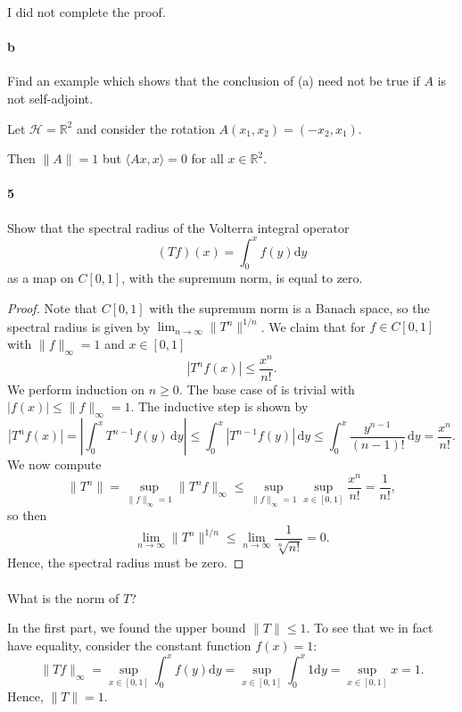 \documentclass[12pt]{article}
\newlength{\myparskip}
\newenvironment{fullbox}{\begin{lrbox}{\savefullbox}\begin{minipage}{\dimexpr\textwidth-2\fboxsep\relax}\setlength{\parskip}{\myparskip}}{\end{minipage}\end{lrbox}\framebox[\textwidth]{\usebox{\savefullbox}}}
\newenvironment{pbox}[1][]{\begin{fullbox}\def\temp{#1}\ifx\temp\empty\else\paragraph{#1}\phantom{}\fi}{\end{fullbox}}
\theoremstyle{definition}
\newcommand{\R}{\mathbb{R}}
\newcommand{\<}{\langle}
\renewcommand{\>}{\rangle}
\newcommand{\dd}{\mathrm{d}}
\newcommand{\HH}{\mathcal{H}}
\begin{document}
I did not complete the proof.

\begin{pbox}[b]
    Find an example which shows that the conclusion of (a) need not be true if $A$ is not self-adjoint.
\end{pbox}

Let $\HH = \R^2$ and consider the rotation $A(x_1, x_2) = (-x_2, x_1)$.

Then $\|A\| = 1$ but $\<Ax, x\> = 0$ for all $x \in \R^2$.

\newpage

\begin{pbox}[5]
    Show that the spectral radius of the Volterra integral operator
    \[
        (Tf)(x) = \int_{0}^{x} f(y) \dd{y} 
    \]
    as a map on $C[0, 1]$, with the supremum norm, is equal to zero.
\end{pbox}

\begin{proof}
    Note that $C[0, 1]$ with the supremum norm is a Banach space, so the spectral radius is given by $\lim_{n \to \infty} \|T^n\|^{1/n}$.
    We claim that for $f \in C[0, 1]$ with $\|f\|_\infty = 1$ and $x \in [0, 1]$
    \[
        |T^nf(x)| \leq \frac{x^n}{n!}.
    \]
    We perform induction on $n \geq 0$.
    The base case of is trivial with $|f(x)| \leq \|f\|_\infty = 1$.
    The inductive step is shown by
    \[
        |T^nf(x)|
            = \left|\int_{0}^{x} T^{n-1}f(y) \,\dd{y} \right|
            \leq \int_{0}^{x} |T^{n-1}f(y)| \,\dd{y}
            \leq \int_{0}^{x} \frac{y^{n-1}}{(n-1)!} \,\dd{y}
            = \frac{x^n}{n!}.
    \]
    We now compute
    \[
        \|T^n\|
            = \sup_{\|f\|_\infty = 1} \|T^nf\|_\infty
            \leq \sup_{\|f\|_\infty = 1} \sup_{x \in [0, 1]} \frac{x^n}{n!}
            = \frac{1}{n!},
    \]
    so then
    \[
        \lim_{n\to\infty} \|T^n\|^{1/n}
            \leq \lim_{n\to\infty} \frac{1}{\sqrt[n]{n!}}
            = 0.
    \]
    Hence, the spectral radius must be zero.
\end{proof}

\begin{pbox}
    What is the norm of $T$?
\end{pbox}

In the first part, we found the upper bound $\|T\| \leq 1$.
To see that we in fact have equality, consider the constant function $f(x) = 1$:
\[
    \|Tf\|_\infty
        = \sup_{x \in [0, 1]} \int_{0}^{x} f(y) \dd{y} 
        = \sup_{x \in [0, 1]} \int_{0}^{x} 1 \dd{y} 
        =  \sup_{x \in [0, 1]} x
        = 1.
\]
Hence, $\|T\| = 1$.
\end{document}
